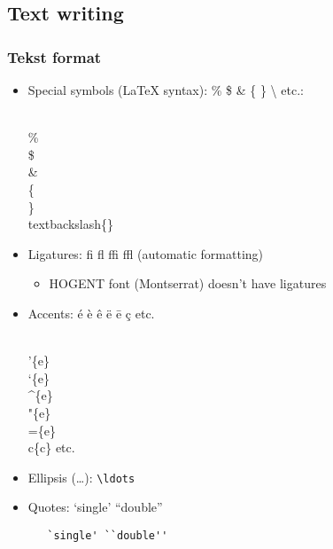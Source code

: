 \documentclass[aspectratio=169]{beamer}
\begin{document}
\subsection{Text writing}

\begin{frame}[fragile]
 \frametitle{Tekst format}

 \begin{itemize}
   \item<+-> Special symbols ({\LaTeX} syntax): \% \$ \& \{ \} \textbackslash{} etc.: \\
   \begin{semiverbatim}
     \\\% \\\$ \\\& \\\{ \\\} \\textbackslash\{\}
   \end{semiverbatim}
   \item<+-> Ligatures: \textrm{fi fl ffi ffl} (automatic formatting)
   \begin{itemize}
    \item HOGENT font (Montserrat) doesn't have ligatures
  \end{itemize}
   \item<+-> Accents: \'{e} \`{e} \^{e} \"{e} \={e} \c{c} etc.
   \begin{semiverbatim}
     \\'\{e\} \\`\{e\} \\^\{e\} \\"\{e\} \\=\{e\} \\c\{c\} etc.
   \end{semiverbatim}
   \item<+-> Ellipsis (\ldots): \texttt{\textbackslash{}ldots}
   \item<+-> Quotes: `single' ``double''
   \begin{verbatim}
   `single' ``double''
   \end{verbatim}
 \end{itemize}
\end{frame}
\end{document}
